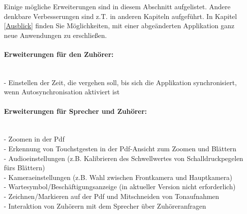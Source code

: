 Einige mögliche Erweiterungen sind in diesem Abschnitt aufgelistet. Andere denkbare Verbesserungen sind z.T. in anderen Kapiteln aufgeführt. In Kapitel \ref{Ausblick} finden Sie Möglichkeiten, mit einer abgeänderten Applikation ganz neue Anwendungen zu erschlie\ss en.

\paragraph{Erweiterungen für den Zuhörer:}$\;$\\
- Einstellen der Zeit, die vergehen soll, bis sich die Applikation synchronisiert, wenn Autosynchronisation aktiviert ist

\paragraph{Erweiterungen für Sprecher und Zuhörer:}$\;$\\
- Zoomen in der Pdf \\
- Erkennung von Touchstgesten in der Pdf-Ansicht zum Zoomen und Blättern\\
- Audioeinstellungen (z.B. Kalibrieren des Schwellwertes von Schalldruckpegelen fürs Blättern)\\
- Kameraeinstellungen (z.B. Wahl zwischen Frontkamera und Hauptkamera)\\
- Wartesymbol/Beschäftigungsanzeige (in aktueller Version nicht erforderlich)\\
- Zeichnen/Markieren auf der Pdf und Mitschneiden von Tonaufnahmen\\
- Interaktion von Zuhörern mit dem Sprecher über Zuhöreranfragen